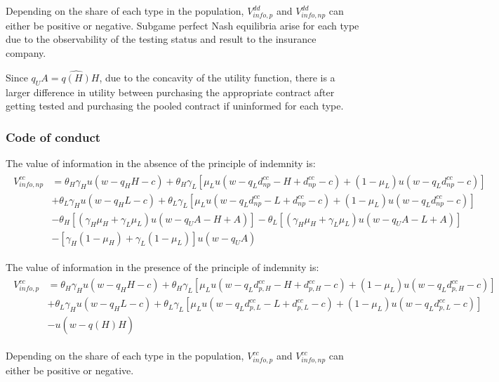 \documentclass[nonatbib,preprint,12pt]{elsarticle}
\theoremstyle{plain}
\theoremstyle{definition}
\theoremstyle{plain}
\theoremstyle{TheoremNum}
\theoremstyle{CorollaryNum}
\theoremstyle{PropositionNum}
\theoremstyle{TheoremNum}
\begin{document}
Depending on the share of each type in the population, $V_{info,p}^{dd}$ and $V_{info,np}^{dd}$ can either be positive or negative. Subgame perfect Nash equilibria arise for each type due to the observability of the testing status and result to the insurance company.

Since $q_U A = \widehat{q(H)}H$, due to the concavity of the utility function, there is a larger difference in utility between purchasing the appropriate contract after getting tested and purchasing the pooled contract if uninformed for each type.



\subsubsection*{Code of conduct}

The value of information in the absence of the principle of indemnity is:
\begin{align}
\begin{split}
    V_{info,np}^{cc} & = \theta_H \gamma_H u(w-q_H H -c) + \theta_H \gamma_L [\mu_L u(w-q_L d_{np}^{cc} - H + d_{np}^{cc}-c) + (1-\mu_L)u(w-q_L d_{np}^{cc}-c)] \\
    & + \theta_L \gamma_H u(w-q_H L-c) + \theta_L \gamma_L [\mu_L u(w-q_L d_{np}^{cc} - L + d_{np}^{cc}-c) + (1-\mu_L)u(w-q_L d_{np}^{cc}-c)] \\
    & - \theta_H [(\gamma_H \mu_H + \gamma_L \mu_L)u(w-q_U A - H + A)] - \theta_L [(\gamma_H \mu_H + \gamma_L \mu_L)u(w-q_U A - L + A)] \\
    & - [\gamma_H (1-\mu_H) + \gamma_L (1-\mu_L)]u(w-q_U A)
\end{split}
\end{align}

The value of information in the presence of the principle of indemnity is:
\begin{align}
\begin{split}
    V_{info,p}^{cc} & = \theta_H \gamma_H u(w-q_H H-c) + \theta_H \gamma_L [\mu_L u(w-q_L d_{p,H}^{cc} - H + d_{p,H}^{cc}-c) + (1-\mu_L)u(w-q_L d_{p,H}^{cc}-c)] \\
    & + \theta_L \gamma_H u(w-q_H L-c) + \theta_L \gamma_L [\mu_L u(w-q_L d_{p,L}^{cc} - L + d_{p,L}^{cc}-c) + (1-\mu_L)u(w-q_L d_{p,L}^{cc}-c)] \\
    & - u(w-\widehat{q(H)}H)
\end{split}
\end{align}

Depending on the share of each type in the population, $V_{info,p}^{cc}$ and $V_{info,np}^{cc}$ can either be positive or negative. 
\end{document}
